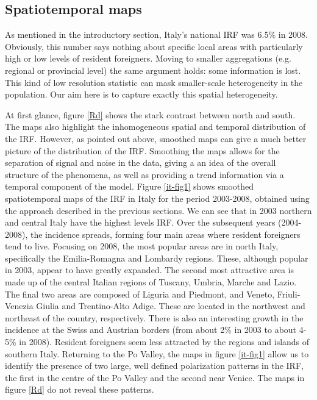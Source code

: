 \subsection{Spatiotemporal maps \label{STT}}

As mentioned in the introductory section, Italy's national IRF was 6.5\% in 2008. Obviously, this number says nothing about specific local areas with particularly high or low levels of resident foreigners. Moving to smaller aggregations (e.g. regional or provincial level) the same argument holds: some information is lost. This kind of low resolution statistic can mask smaller-scale heterogeneity in the population. Our aim here is to capture exactly this spatial heterogeneity.

At first glance, figure \ref{Rd} shows the stark contrast between north and south. The maps also highlight the inhomogeneous spatial and temporal distribution of the IRF. However, as pointed out above, smoothed maps can give a much better picture of the distribution of the IRF. Smoothing the maps allows for the separation of signal and noise in the data, giving a an idea of the overall structure of the phenomena, as well as providing a trend information via a temporal component of the model. Figure \ref{it-fig1} shows smoothed spatiotemporal maps of the IRF in Italy for the period 2003-2008, obtained using the approach described in the previous sections. We can see that in 2003 northern and central Italy have the highest levels IRF. Over the subsequent years (2004-2008), the incidence spreads, forming four main areas where resident foreigners tend to live. Focusing on 2008, the most popular areas are in north Italy, specifically the Emilia-Romagna and Lombardy regions. These, although popular in 2003, appear to have greatly expanded. The second most attractive area is made up of the central Italian regions of Tuscany, Umbria, Marche and Lazio. The final two areas are composed of Liguria and Piedmont, and Veneto, Friuli-Venezia Giulia and Trentino-Alto Adige. These are located in the northwest and northeast of the country, respectively. There is also an interesting growth in the incidence at the Swiss and Austrian borders (from about 2\% in 2003 to about 4-5\% in 2008). Resident foreigners seem less attracted by the regions and islands of southern Italy. Returning to the Po Valley, the maps in figure \ref{it-fig1} allow us to identify the presence of two large, well defined polarization patterns in the IRF, the first in the centre of the Po Valley and the second near Venice. The maps in figure \ref{Rd} do not reveal these patterns.

